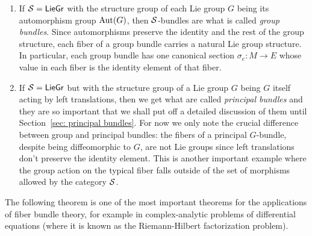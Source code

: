 \begin{example}
    \begin{enumerate}
        \item If $\mathcal{S}=\mathsf{LieGr}$ with the structure group of each Lie group $G$ being its automorphism group $\operatorname{Aut}(G)$, then $\mathcal{S}$-bundles are what is called \emph{group bundles}. Since automorphisms preserve the identity and the rest of the group structure, each fiber of a group bundle carries a natural Lie group structure. In particular, each group bundle has one canonical section $\sigma_e:M\to E$ whose value in each fiber is the identity element of that fiber.
        
        \item If $\mathcal{S}=\mathsf{LieGr}$ but with the structure group of a Lie group $G$ being $G$ itself acting by left translations, then we get what are called \emph{principal bundles} and they are so important that we shall put off a detailed discussion of them until Section~\ref{sec: principal bundles}. For now we only note the crucial difference between group and principal bundles: the fibers of a principal $G$-bundle, despite being diffeomorphic to $G$, are not Lie groups since left translations don't preserve the identity element. This is another important example where the group action on the typical fiber falls outside of the set of morphisms allowed by the category $\mathcal{S}$.
    \end{enumerate}
\end{example}

The following theorem is one of the most important theorems for the applications of fiber bundle theory, for example in complex-analytic problems of differential equations (where it is known as the Riemann-Hilbert factorization problem).

